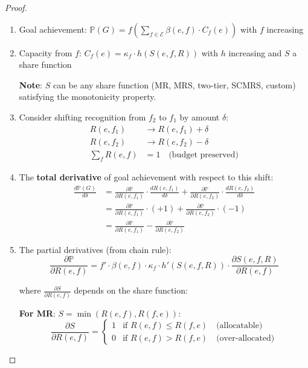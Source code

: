 \documentclass[11pt,a4paper]{article}
\theoremstyle{definition}
\theoremstyle{remark}
\newcommand{\E}{\mathcal{E}}
\begin{document}
\begin{proof}
\begin{enumerate}
\item Goal achievement: $\mathbb{P}(G) = f\left(\sum_{f \in \E} \beta(e,f) \cdot C_f(e)\right)$ with $f$ increasing
\item Capacity from $f$: $C_f(e) = \kappa_f \cdot h(S(e,f,R))$ with $h$ increasing and $S$ a share function
  
  \textbf{Note}: $S$ can be any share function (MR, MRS, two-tier, SCMRS, custom) satisfying the monotonicity property.

\item Consider shifting recognition from $f_2$ to $f_1$ by amount $\delta$:
\begin{align*}
R(e,f_1) &\to R(e,f_1) + \delta \\
R(e,f_2) &\to R(e,f_2) - \delta \\
\sum_f R(e,f) &= 1 \quad \text{(budget preserved)}
\end{align*}

\item The \textbf{total derivative} of goal achievement with respect to this shift:
\begin{align*}
\frac{d\mathbb{P}(G)}{d\delta} &= \frac{\partial \mathbb{P}}{\partial R(e,f_1)} \cdot \frac{dR(e,f_1)}{d\delta} + \frac{\partial \mathbb{P}}{\partial R(e,f_2)} \cdot \frac{dR(e,f_2)}{d\delta} \\
&= \frac{\partial \mathbb{P}}{\partial R(e,f_1)} \cdot (+1) + \frac{\partial \mathbb{P}}{\partial R(e,f_2)} \cdot (-1) \\
&= \frac{\partial \mathbb{P}}{\partial R(e,f_1)} - \frac{\partial \mathbb{P}}{\partial R(e,f_2)}
\end{align*}

\item The partial derivatives (from chain rule):
\[ \frac{\partial \mathbb{P}}{\partial R(e,f)} = f' \cdot \beta(e,f) \cdot \kappa_f \cdot h'(S(e,f,R)) \cdot \frac{\partial S(e,f,R)}{\partial R(e,f)} \]

where $\frac{\partial S}{\partial R(e,f)}$ depends on the share function:

\textbf{For MR}: $S = \min(R(e,f), R(f,e))$:
\[ \frac{\partial S}{\partial R(e,f)} = \begin{cases}
1 & \text{if } R(e,f) \le R(f,e) \quad \text{(allocatable)} \\
0 & \text{if } R(e,f) > R(f,e) \quad \text{(over-allocated)}
\end{cases} \]


\end{enumerate}
\end{proof}
\end{document}

